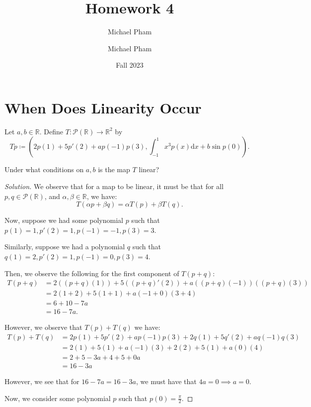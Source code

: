 \documentclass{article}
\title{#1}
\author{Michael Pham}
\date{#2}
\newenvironment{solution}{\begin{proof}[Solution]}{\end{proof}}
\newcommand{\RR}{\mathbb{R}}
\newcommand{\mytitle}[2]{%
	\title{#1}
	\author{Michael Pham}
	\date{#2}
	\maketitle
	\newpage
	\tableofcontents
	\newpage
}
\begin{document}
	\mytitle{Homework 4}{Fall 2023}
	
	\section{When Does Linearity Occur}
	\begin{hw}
		Let $a,b \in \RR$. Define $T: \mathscr{P}(\RR) \rightarrow \RR^{2}$ by 
		\begin{equation*}
			Tp \coloneq (2p(1) + 5p'(2) + ap(-1)p(3), \int_{-1}^{1} x^{3}p(x)\mathrm d x + b\sin p(0)).
		\end{equation*}
	
		Under what conditions on $a,b$ is the map $T$ linear?
	\end{hw}
	\begin{solution}
		We observe that for a map to be linear, it must be that for all $p, q \in \mathscr{P}(\RR)$, and $\alpha, \beta \in \RR$, we have:
		\begin{equation*}
			T(\alpha p + \beta q) = \alpha T(p) + \beta T(q).
		\end{equation*}
	
		Now, suppose we had some polynomial $p$ such that $p(1) = 1, p'(2) = 1, p(-1) = -1, p(3) = 3$. 
		
		Similarly, suppose we had a polynomial $q$ such that $q(1) = 2, p'(2) = 1, p(-1) = 0, p(3) = 4$.
		
		Then, we observe the following for the first component of $T(p+q)$:
		\begin{align*}
			T(p+q) &= 2( (p+q)(1)) + 5((p+q)'(2)) + a( (p+q)(-1))( (p+q)(3)) \\
			&= 2(1+2) + 5(1+1) + a(-1 + 0)(3 + 4) \\
			&= 6 + 10 - 7a \\
			&= 16 - 7a.
		\end{align*}
	
		However, we observe that $T(p) + T(q)$ we have:
		\begin{align*}
			T(p) + T(q) &= 2p(1) + 5p'(2) + ap(-1)p(3) + 2q(1) + 5q'(2) + aq(-1)q(3) \\
			&= 2(1) + 5(1) + a(-1)(3) + 2(2) + 5(1) + a(0)(4) \\
			&= 2 + 5 -3a + 4 + 5 + 0a \\
			&= 16 -3a
		\end{align*}
	
		However, we see that for $16 - 7a = 16 - 3a$, we must have that $4a = 0 \implies a = 0$.
		
		Now, we consider some polynomial $p$ such that $p(0) = \frac{\pi}{2}$.
		

\end{solution}
\end{document}
